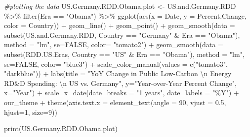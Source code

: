 \documentclass[
  12pt,
]{article}
\newenvironment{Shaded}{\begin{snugshade}}{\end{snugshade}}
\newcommand{\AttributeTok}[1]{\textcolor[rgb]{0.77,0.63,0.00}{#1}}
\newcommand{\CommentTok}[1]{\textcolor[rgb]{0.56,0.35,0.01}{\textit{#1}}}
\newcommand{\ConstantTok}[1]{\textcolor[rgb]{0.00,0.00,0.00}{#1}}
\newcommand{\DecValTok}[1]{\textcolor[rgb]{0.00,0.00,0.81}{#1}}
\newcommand{\FloatTok}[1]{\textcolor[rgb]{0.00,0.00,0.81}{#1}}
\newcommand{\FunctionTok}[1]{\textcolor[rgb]{0.00,0.00,0.00}{#1}}
\newcommand{\NormalTok}[1]{#1}
\newcommand{\OtherTok}[1]{\textcolor[rgb]{0.56,0.35,0.01}{#1}}
\newcommand{\SpecialCharTok}[1]{\textcolor[rgb]{0.00,0.00,0.00}{#1}}
\newcommand{\StringTok}[1]{\textcolor[rgb]{0.31,0.60,0.02}{#1}}
\begin{document}
\begin{Shaded}
\begin{Highlighting}[]
\CommentTok{\#plotting the data}
\NormalTok{US.Germany.RDD.Obama.plot }\OtherTok{\textless{}{-}}\NormalTok{ US.and.Germany.RDD }\SpecialCharTok{\%\textgreater{}\%}
  \FunctionTok{filter}\NormalTok{(Era }\SpecialCharTok{==} \StringTok{"Obama"}\NormalTok{) }\SpecialCharTok{\%\textgreater{}\%}
  \FunctionTok{ggplot}\NormalTok{(}\FunctionTok{aes}\NormalTok{(}\AttributeTok{x =}\NormalTok{ Date,}
             \AttributeTok{y =}\NormalTok{ Percent.Change, }
             \AttributeTok{color =}\NormalTok{ Country)) }\SpecialCharTok{+} 
  \FunctionTok{geom\_line}\NormalTok{() }\SpecialCharTok{+}
  \FunctionTok{geom\_point}\NormalTok{() }\SpecialCharTok{+}
  \FunctionTok{geom\_smooth}\NormalTok{(}\AttributeTok{data =} \FunctionTok{subset}\NormalTok{(US.and.Germany.RDD, Country }\SpecialCharTok{==} \StringTok{"Germany"} \SpecialCharTok{\&}\NormalTok{ Era }\SpecialCharTok{==} \StringTok{"Obama"}\NormalTok{), }\AttributeTok{method =} \StringTok{"lm"}\NormalTok{, }\AttributeTok{se=}\ConstantTok{FALSE}\NormalTok{, }\AttributeTok{color=} \StringTok{"tomato2"}\NormalTok{) }\SpecialCharTok{+}
  \FunctionTok{geom\_smooth}\NormalTok{(}\AttributeTok{data =} \FunctionTok{subset}\NormalTok{(RDD.US.Eras, Country }\SpecialCharTok{==} \StringTok{"US"} \SpecialCharTok{\&}\NormalTok{ Era }\SpecialCharTok{==} \StringTok{"Obama"}\NormalTok{), }\AttributeTok{method =} \StringTok{"lm"}\NormalTok{, }\AttributeTok{se=}\ConstantTok{FALSE}\NormalTok{, }\AttributeTok{color=} \StringTok{"blue3"}\NormalTok{) }\SpecialCharTok{+}
  \FunctionTok{scale\_color\_manual}\NormalTok{(}\AttributeTok{values =} \FunctionTok{c}\NormalTok{(}\StringTok{"tomato3"}\NormalTok{, }\StringTok{"darkblue"}\NormalTok{)) }\SpecialCharTok{+}
  \FunctionTok{labs}\NormalTok{(}\AttributeTok{title =} \StringTok{"YoY Change in Public Low{-}Carbon }\SpecialCharTok{\textbackslash{}n}\StringTok{ Energy RD\&D Spending: }\SpecialCharTok{\textbackslash{}n}\StringTok{ US vs. Germany"}\NormalTok{,}
       \AttributeTok{y=}\StringTok{"Year{-}over{-}Year Percent Change"}\NormalTok{,}
       \AttributeTok{x=}\StringTok{"Year"}\NormalTok{) }\SpecialCharTok{+} 
  \FunctionTok{scale\_x\_date}\NormalTok{(}\AttributeTok{date\_breaks =} \StringTok{"1 years"}\NormalTok{, }\AttributeTok{date\_labels =} \StringTok{"\%Y"}\NormalTok{) }\SpecialCharTok{+}
\NormalTok{  our\_theme }\SpecialCharTok{+}
  \FunctionTok{theme}\NormalTok{(}\AttributeTok{axis.text.x =} \FunctionTok{element\_text}\NormalTok{(}\AttributeTok{angle =} \DecValTok{90}\NormalTok{, }\AttributeTok{vjust =} \FloatTok{0.5}\NormalTok{, }\AttributeTok{hjust=}\DecValTok{1}\NormalTok{, }\AttributeTok{size=}\DecValTok{9}\NormalTok{))}
  
\FunctionTok{print}\NormalTok{(US.Germany.RDD.Obama.plot)}
\end{Highlighting}
\end{Shaded}
\end{document}
